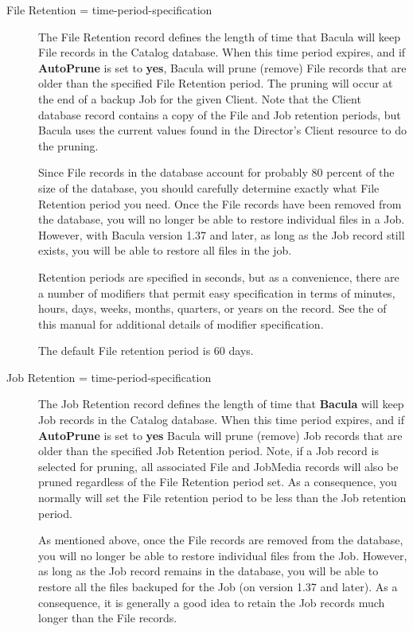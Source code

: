 \begin{description}

\item [File Retention = \lt{}time-period-specification\gt{}]
   The  File Retention record defines the length of time that  Bacula will keep
File records in the Catalog database.  When this time period expires, and if
{\bf AutoPrune} is set to {\bf yes}, Bacula will prune (remove) File records
that  are older than the specified File Retention period. The pruning  will
occur at the end of a backup Job for the given Client.  Note that the Client
database record contains a copy of the  File and Job retention periods, but
Bacula uses the  current values found in the Director's Client resource to  do
the pruning.  

Since File records in the database account for probably 80 percent of the 
size of the database, you should carefully determine exactly what File
Retention period you need. Once the File records have been removed from
the database, you will no longer be able to restore individual files
in a Job. However, with Bacula version 1.37 and later, as long as the
Job record still exists, you will be able to restore all files in the
job.

Retention periods are specified in seconds, but as a convenience, there are
a number of modifiers that permit easy specification in terms of minutes,
hours, days, weeks, months, quarters, or years on the record.  See the
 of this manual for additional details
of modifier specification.

The default File retention period is 60 days.  

\item [Job Retention = \lt{}time-period-specification\gt{}]
   The Job Retention record defines the length of time that {\bf Bacula}
will keep Job records in the Catalog database.  When this time period
expires, and if {\bf AutoPrune} is set to {\bf yes} Bacula will prune
(remove) Job records that are older than the specified Job Retention
period.  Note, if a Job record is selected for pruning, all associated File
and JobMedia records will also be pruned regardless of the File Retention
period set.  As a consequence, you normally will set the File retention
period to be less than the Job retention period.

As mentioned above, once the File records are removed from the database,
you will no longer be able to restore individual files from the Job.
However, as long as the Job record remains in the database, you will be
able to restore all the files backuped for the Job (on version 1.37 and 
later). As a consequence, it is generally a good idea to retain the Job
records much longer than the File records.


\end{description}
